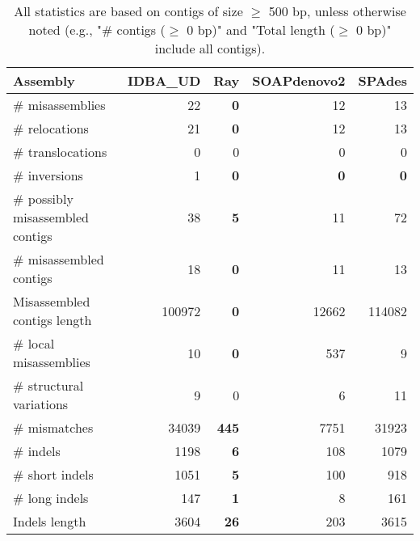 \documentclass[12pt,a4paper]{article}
\begin{document}
\begin{table}[ht]
\begin{center}
\caption{All statistics are based on contigs of size $\geq$ 500 bp, unless otherwise noted (e.g., "\# contigs ($\geq$ 0 bp)" and "Total length ($\geq$ 0 bp)" include all contigs).}
\begin{tabular}{|l*{4}{|r}|}
\hline
Assembly & IDBA\_UD & Ray & SOAPdenovo2 & SPAdes \\ \hline
\# misassemblies & 22 & {\bf 0} & 12 & 13 \\ \hline
\hspace{5mm}\# relocations & 21 & {\bf 0} & 12 & 13 \\ \hline
\hspace{5mm}\# translocations & 0 & 0 & 0 & 0 \\ \hline
\hspace{5mm}\# inversions & 1 & {\bf 0} & {\bf 0} & {\bf 0} \\ \hline
\# possibly misassembled contigs & 38 & {\bf 5} & 11 & 72 \\ \hline
\# misassembled contigs & 18 & {\bf 0} & 11 & 13 \\ \hline
Misassembled contigs length & 100972 & {\bf 0} & 12662 & 114082 \\ \hline
\# local misassemblies & 10 & {\bf 0} & 537 & 9 \\ \hline
\# structural variations & 9 & 0 & 6 & 11 \\ \hline
\# mismatches & 34039 & {\bf 445} & 7751 & 31923 \\ \hline
\# indels & 1198 & {\bf 6} & 108 & 1079 \\ \hline
\hspace{5mm}\# short indels & 1051 & {\bf 5} & 100 & 918 \\ \hline
\hspace{5mm}\# long indels & 147 & {\bf 1} & 8 & 161 \\ \hline
Indels length & 3604 & {\bf 26} & 203 & 3615 \\ \hline
\end{tabular}
\end{center}
\end{table}
\end{document}
